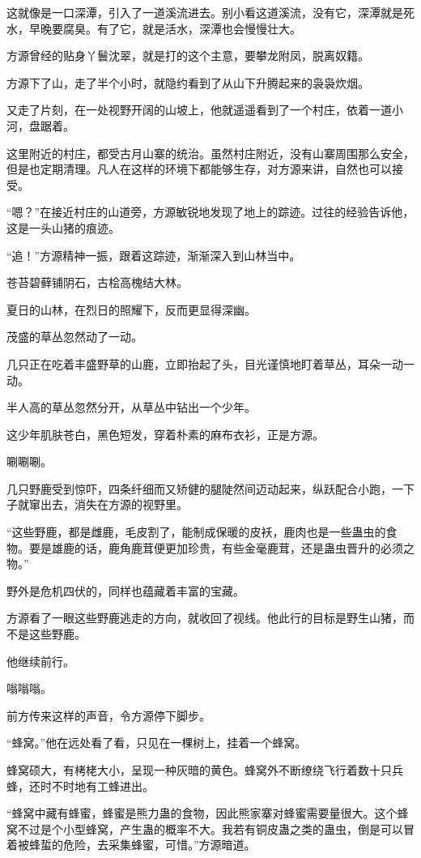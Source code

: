\begin{this_body}
这就像是一口深潭，引入了一道溪流进去。别小看这道溪流，没有它，深潭就是死水，早晚要腐臭。有了它，就是活水，深潭也会慢慢壮大。

方源曾经的贴身丫鬟沈翠，就是打的这个主意，要攀龙附凤，脱离奴籍。

方源下了山，走了半个小时，就隐约看到了从山下升腾起来的袅袅炊烟。

又走了片刻，在一处视野开阔的山坡上，他就遥遥看到了一个村庄，依着一道小河，盘踞着。

这里附近的村庄，都受古月山寨的统治。虽然村庄附近，没有山寨周围那么安全，但是也定期清理。凡人在这样的环境下都能够生存，对方源来讲，自然也可以接受。

“嗯？”在接近村庄的山道旁，方源敏锐地发现了地上的踪迹。过往的经验告诉他，这是一头山猪的痕迹。

“追！”方源精神一振，跟着这踪迹，渐渐深入到山林当中。

苍苔碧藓铺阴石，古桧高槐结大林。

夏日的山林，在烈日的照耀下，反而更显得深幽。

茂盛的草丛忽然动了一动。

几只正在吃着丰盛野草的山鹿，立即抬起了头，目光谨慎地盯着草丛，耳朵一动一动。

半人高的草丛忽然分开，从草丛中钻出一个少年。

这少年肌肤苍白，黑色短发，穿着朴素的麻布衣衫，正是方源。

唰唰唰。

几只野鹿受到惊吓，四条纤细而又矫健的腿陡然间迈动起来，纵跃配合小跑，一下子就窜出去，消失在方源的视野里。

“这些野鹿，都是雌鹿，毛皮割了，能制成保暖的皮袄，鹿肉也是一些蛊虫的食物。要是雄鹿的话，鹿角鹿茸便更加珍贵，有些金毫鹿茸，还是蛊虫晋升的必须之物。”

野外是危机四伏的，同样也蕴藏着丰富的宝藏。

方源看了一眼这些野鹿逃走的方向，就收回了视线。他此行的目标是野生山猪，而不是这些野鹿。

他继续前行。

嗡嗡嗡。

前方传来这样的声音，令方源停下脚步。

“蜂窝。”他在远处看了看，只见在一棵树上，挂着一个蜂窝。

蜂窝硕大，有栲栳大小，呈现一种灰暗的黄色。蜂窝外不断缭绕飞行着数十只兵蜂，还时不时地有工蜂进出。

“蜂窝中藏有蜂蜜，蜂蜜是熊力蛊的食物，因此熊家寨对蜂蜜需要量很大。这个蜂窝不过是个小型蜂窝，产生蛊的概率不大。我若有铜皮蛊之类的蛊虫，倒是可以冒着被蜂蜇的危险，去采集蜂蜜，可惜。”方源暗道。


\end{this_body}
